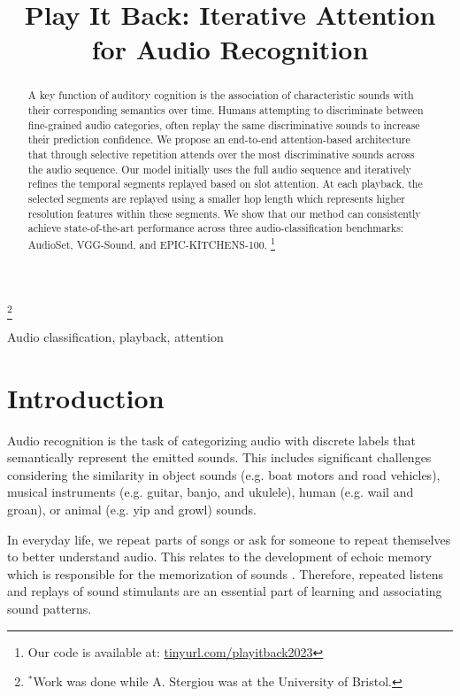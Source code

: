 \documentclass{article}
\title{Play It Back: Iterative Attention for Audio Recognition}
\begin{document}
\maketitle

{\let\thefootnote\relax\footnote{{$\!^*$Work was done while A. Stergiou was at the University of Bristol.}}}
\setcounter{footnote}{0}

\vspace*{-20pt}
\begin{abstract}
A key function of auditory cognition is the association of characteristic sounds with their corresponding semantics over time.
Humans attempting to discriminate between fine-grained audio categories, often replay the same discriminative sounds to increase their prediction confidence.
We propose an end-to-end attention-based architecture that through selective repetition attends over the most discriminative sounds across the audio sequence. Our model initially uses the full audio sequence and iteratively refines the temporal segments replayed based on slot attention. At each playback, the selected segments are replayed using a smaller hop length which represents higher resolution features within these segments. 
We show that our method can consistently achieve state-of-the-art performance across three audio-classification benchmarks: AudioSet, VGG-Sound, and EPIC-KITCHENS-100. \protect\footnote{Our code is available at: \url{tinyurl.com/playitback2023}}
\end{abstract}
\begin{keywords}
Audio classification, playback, attention
\end{keywords}


\section{Introduction}
\label{sec:intro}

Audio recognition is the task of categorizing audio with discrete labels that semantically represent the emitted sounds. This includes significant challenges considering the similarity in object sounds (e.g. boat motors and road vehicles), musical instruments (e.g. guitar, banjo, and ukulele), human (e.g. wail and groan), or animal (e.g. yip and growl) sounds. 



In everyday life, we repeat parts of songs or ask for someone to repeat themselves to better understand audio. This relates to the development of echoic memory which is responsible for the memorization of sounds \cite{clark1987echoic,strous1995auditory}. Therefore, repeated listens and replays of sound stimulants \cite{radvansky2005human} are an essential part of learning and associating sound patterns.  
\end{document}
